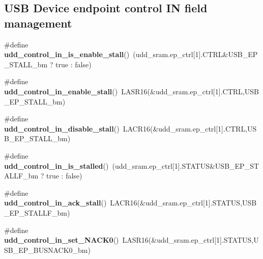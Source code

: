 \subsection*{U\-S\-B Device endpoint control I\-N field management}
\begin{DoxyCompactItemize}
\item 
\hypertarget{group__udd__xmega__usb__group_gae15590f51e4b6d633f923d8e22d2c74e}{\#define {\bfseries udd\-\_\-control\-\_\-in\-\_\-is\-\_\-enable\-\_\-stall}()~(udd\-\_\-sram.\-ep\-\_\-ctrl\mbox{[}1\mbox{]}.C\-T\-R\-L\&U\-S\-B\-\_\-\-E\-P\-\_\-\-S\-T\-A\-L\-L\-\_\-bm ? true \-: false)}\label{group__udd__xmega__usb__group_gae15590f51e4b6d633f923d8e22d2c74e}

\item 
\hypertarget{group__udd__xmega__usb__group_gac43e6ddd6ab3c8c6b975bd2c51cdbddc}{\#define {\bfseries udd\-\_\-control\-\_\-in\-\_\-enable\-\_\-stall}()~L\-A\-S\-R16(\&udd\-\_\-sram.\-ep\-\_\-ctrl\mbox{[}1\mbox{]}.C\-T\-R\-L,U\-S\-B\-\_\-\-E\-P\-\_\-\-S\-T\-A\-L\-L\-\_\-bm)}\label{group__udd__xmega__usb__group_gac43e6ddd6ab3c8c6b975bd2c51cdbddc}

\item 
\hypertarget{group__udd__xmega__usb__group_ga37e95131b3bb4dac1f542f059c7453f9}{\#define {\bfseries udd\-\_\-control\-\_\-in\-\_\-disable\-\_\-stall}()~L\-A\-C\-R16(\&udd\-\_\-sram.\-ep\-\_\-ctrl\mbox{[}1\mbox{]}.C\-T\-R\-L,U\-S\-B\-\_\-\-E\-P\-\_\-\-S\-T\-A\-L\-L\-\_\-bm)}\label{group__udd__xmega__usb__group_ga37e95131b3bb4dac1f542f059c7453f9}

\item 
\hypertarget{group__udd__xmega__usb__group_gad03e4ff92ea258778208f35c6ab8294f}{\#define {\bfseries udd\-\_\-control\-\_\-in\-\_\-is\-\_\-stalled}()~(udd\-\_\-sram.\-ep\-\_\-ctrl\mbox{[}1\mbox{]}.S\-T\-A\-T\-U\-S\&U\-S\-B\-\_\-\-E\-P\-\_\-\-S\-T\-A\-L\-L\-F\-\_\-bm ? true \-: false)}\label{group__udd__xmega__usb__group_gad03e4ff92ea258778208f35c6ab8294f}

\item 
\hypertarget{group__udd__xmega__usb__group_gad1c226388b78b12bfa29fafeca4f7421}{\#define {\bfseries udd\-\_\-control\-\_\-in\-\_\-ack\-\_\-stall}()~L\-A\-C\-R16(\&udd\-\_\-sram.\-ep\-\_\-ctrl\mbox{[}1\mbox{]}.S\-T\-A\-T\-U\-S,U\-S\-B\-\_\-\-E\-P\-\_\-\-S\-T\-A\-L\-L\-F\-\_\-bm)}\label{group__udd__xmega__usb__group_gad1c226388b78b12bfa29fafeca4f7421}

\item 
\hypertarget{group__udd__xmega__usb__group_gaf2d9dff2f782745f6c325dd544a91b4f}{\#define {\bfseries udd\-\_\-control\-\_\-in\-\_\-set\-\_\-\-N\-A\-C\-K0}()~L\-A\-S\-R16(\&udd\-\_\-sram.\-ep\-\_\-ctrl\mbox{[}1\mbox{]}.S\-T\-A\-T\-U\-S,U\-S\-B\-\_\-\-E\-P\-\_\-\-B\-U\-S\-N\-A\-C\-K0\-\_\-bm)}\label{group__udd__xmega__usb__group_gaf2d9dff2f782745f6c325dd544a91b4f}


\end{DoxyCompactItemize}
